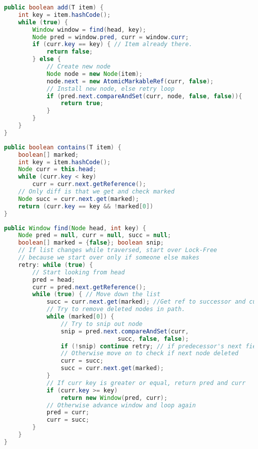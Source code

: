 %
\clearpage
%
\begin{tcolorbox}[colback=nightblue!5!white, colframe=nightblue!75!black, title= Add(Lock-Free)]
    \begin{lstlisting}[label={lst:lockfree4}, language=Java, morekeywords={Window, Node, T}]
public boolean add(T item) {
    int key = item.hashCode();
    while (true) {
        Window window = find(head, key);
        Node pred = window.pred, curr = window.curr;
        if (curr.key == key) { // Item already there.
            return false;
        } else {
            // Create new node
            Node node = new Node(item);
            node.next = new AtomicMarkableRef(curr, false);
            // Install new node, else retry loop
            if (pred.next.compareAndSet(curr, node, false, false)){
                return true;
            }
        }
    }
}\end{lstlisting}
\end{tcolorbox}
\begin{tcolorbox}[colback=nightblue!5!white, colframe=nightblue!75!black, title= Contains(Wait-Free)]
    \begin{lstlisting}[label={lst:lockfree5}, language=Java, morekeywords={Window, Node, T}]
public boolean contains(T item) {
    boolean[] marked;
    int key = item.hashCode();
    Node curr = this.head;
    while (curr.key < key)
        curr = curr.next.getReference();
    // Only diff is that we get and check marked
    Node succ = curr.next.get(marked);
    return (curr.key == key && !marked[0])
}\end{lstlisting}
\end{tcolorbox}
%
\clearpage
%
\begin{tcolorbox}[colback=nightblue!5!white, colframe=nightblue!75!black, title= Contains(Wait-Free)]
    \begin{lstlisting}[label={lst:lockfree6}, language=Java, morekeywords={Window, Node, T}]
public Window find(Node head, int key) {
    Node pred = null, curr = null, succ = null;
    boolean[] marked = {false}; boolean snip;
    // If list changes while traversed, start over Lock-Free
    // because we start over only if someone else makes
    retry: while (true) {
        // Start looking from head
        pred = head;
        curr = pred.next.getReference();
        while (true) { // Move down the list
            succ = curr.next.get(marked); //Get ref to successor and current deleted bit
            // Try to remove deleted nodes in path.
            while (marked[0]) {
                // Try to snip out node
                snip = pred.next.compareAndSet(curr,
                                succ, false, false);
                if (!snip) continue retry; // if predecessor's next field changed must retry whole
                // Otherwise move on to check if next node deleted
                curr = succ;
                succ = curr.next.get(marked);
            }
            // If curr key is greater or equal, return pred and curr
            if (curr.key >= key)
                return new Window(pred, curr);
            // Otherwise advance window and loop again
            pred = curr;
            curr = succ;
        }
    }
}\end{lstlisting}
\end{tcolorbox}
%
\clearpage
%
